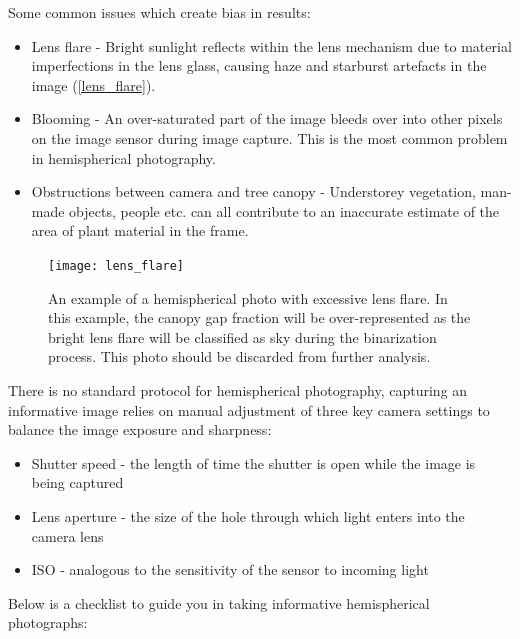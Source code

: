 \documentclass[11pt,a4paper]{article}
\begin{document}
Some common issues which create bias in results:

\begin{itemize}
	\item{Lens flare - Bright sunlight reflects within the lens mechanism due to material imperfections in the lens glass, causing haze and starburst artefacts in the image (\autoref{lens_flare}).}
	\item{Blooming - An over-saturated part of the image bleeds over into other pixels on the image sensor during image capture. This is the most common problem in hemispherical photography.}
	\item{Obstructions between camera and tree canopy - Understorey vegetation, man-made objects, people etc. can all contribute to an inaccurate estimate of the area of plant material in the frame.}
\end{itemize}

\begin{figure}[H]
\centering
	\texttt{[image: lens\_flare]}
	\caption{An example of a hemispherical photo with excessive lens flare. In this example, the canopy gap fraction will be over-represented as the bright lens flare will be classified as sky during the binarization process. This photo should be discarded from further analysis.}
	\label{lens_flare}
\end{figure}

There is no standard protocol for hemispherical photography, capturing an informative image relies on manual adjustment of three key camera settings to balance the image exposure and sharpness:

\begin{itemize}
	\item{Shutter speed - the length of time the shutter is open while the
		image is being captured}
	\item{Lens aperture - the size of the hole through which light enters into
		the camera lens}
	\item{ISO - analogous to the sensitivity of the sensor to incoming light}
\end{itemize}

Below is a checklist to guide you in taking informative hemispherical photographs: 
\end{document}
